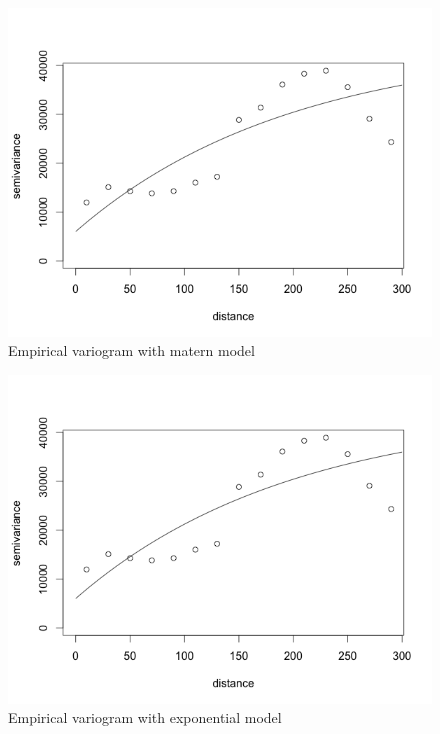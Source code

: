 \documentclass[12pt,twoside]{reedthesis}
\begin{document}
\begin{figure}[h!]
	   
	       \centering
	  
	    \includegraphics[scale=0.5]{vario_matern}
	
	     \caption{Empirical variogram with matern model}
	 \label{matern}
	\end{figure}
	
\begin{figure}[h!]
	   
	       \centering
	  
	    \includegraphics[scale=0.5]{vario_exp}
	
	     \caption{Empirical variogram with exponential model}
	 \label{exp}
	\end{figure}
	
\end{document}
